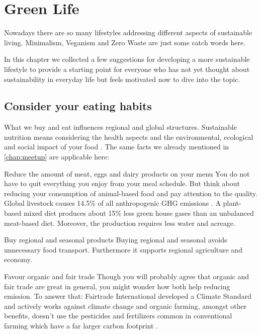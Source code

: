
\chapter{Green Life}\label{chap:more}
 
Nowadays there are so many lifestyles addressing different aspects of sustainable living. Minimalism, Veganism and Zero Waste are just some catch words here. 

In this chapter we collected a few suggestions for developing a more sustainable lifestyle to provide a starting point for everyone who has not yet thought about sustainability in everyday life but feels motivated now to dive into the topic.

\section{Consider your eating habits} 
 	What we buy and eat influences regional and global structures. Sustainable nutrition means considering the health aspects and the environmental, ecological and social impact of your food \cite{food}. The same facts we already mentioned in \cref{chap:meetup} are applicable here:
 	
\begin{suggest}{Reduce the amount of meat, eggs and dairy products on your menu}%
 	You do not have to quit everything you enjoy from your meal schedule. But think about reducing your consumption of animal-based food and pay attention to the quality. Global livestock causes 14.5\% of all anthropogenic GHG emissions \cite{livestock}.
 	A plant-based mixed diet produces about 15\% less green house gases than an unbalanced meat-based diet. Moreover, the production requires less water and acreage. \cite{food}
\end{suggest}
 	
\begin{suggest}{Buy regional and seasonal products}
  	Buying regional and seasonal avoids unnecessary food transport. 
  	Furthermore it supports regional agriculture and economy. 
\end{suggest}

\begin{suggest}{Favour organic and fair trade}
	Though you will probably agree that organic and fair trade are great in general, you might wonder how both help reducing emission. To answer that: Fairtrade International developed a Climate Standard and actively works against climate change \cite{fairtrade} and organic farming, amongst other benefits, doesn't use the pesticides and fertilizers common in conventional farming which have a far larger carbon footprint \cite{organic}.
\end{suggest}

